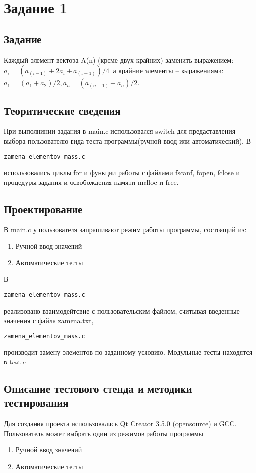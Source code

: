 \documentclass[12pt,a4paper]{report}
\begin{document}
\section{Задание 1}
\subsection{Задание}
Каждый элемент вектора A(n) (кроме двух крайних) заменить выражением: $a_i = (a_(i-1) + 2a_i + a_(i+1)) / 4$, а крайние элементы – выражениями: $a_1 = (a_1 + a_2)/2, a_n = (a_(n-1) + a_n)/2$.
\subsection{Теоритические сведения}
При выполнинии задания в main.c использовался switch для предаставления выбора пользователю вида теста программы(ручной ввод или автоматический). В \begin{verbatim}zamena_elementov_mass.c \end{verbatim} использовались циклы for и функции работы с файлами fscanf, fopen, fclose и процедуры задания и освобождения памяти malloc и free.
\subsection{Проектирование}
В main.c у пользователя запрашивают режим работы программы, состоящий из:
\begin{enumerate}
\item Ручной ввод значений
\item Автоматические тесты
\end{enumerate}

В \begin{verbatim}zamena_elementov_mass.c \end{verbatim}  реализовано взаимодейтсвие с пользовательским файлом, считывая введенные значения с файла zamena.txt, \begin{verbatim}zamena_elementov_mass.c \end{verbatim}  производит замену элементов по заданному условию.
Модульные тесты находятся в test.c.
\subsection{Описание тестового стенда и методики тестирования}
Для создания проекта использовались Qt Creator 3.5.0 (opensource) и GCC.
Пользователь может выбрать один из режимов работы программы

\begin{enumerate}
\item Ручной ввод значений
\item Автоматические тесты
\end{enumerate}
\end{document}
